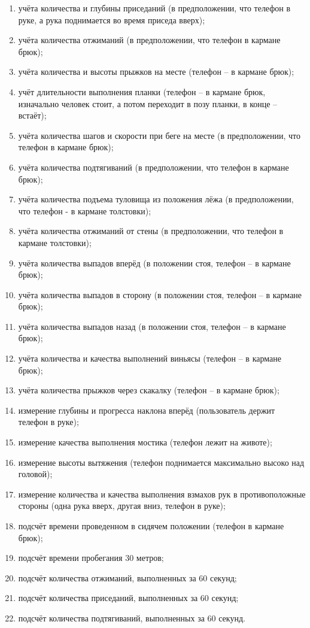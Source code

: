 \begin{enumerate}
	\item учёта количества и глубины приседаний (в предположении, что телефон в руке, а рука поднимается во время приседа вверх);
	\item учёта количества отжиманий (в предположении, что телефон в кармане брюк);
	\item учёта количества и высоты прыжков на месте (телефон -- в кармане брюк);
	\item учёт длительности выполнения планки (телефон -- в кармане брюк, изначально человек стоит, а потом переходит в позу планки, в конце -- встаёт);
	\item учёта количества шагов и скорости при беге на месте (в предположении, что телефон в кармане брюк);
	\item учёта количества подтягиваний (в предположении, что телефон в кармане брюк);
	\item учёта количества подъема туловища из положения лёжа (в предположении, что телефон - в кармане толстовки);
	\item учёта количества отжиманий от стены (в предположении, что телефон в кармане толстовки);
	\item учёта количества выпадов вперёд (в положении стоя, телефон -- в кармане брюк);
	\item учёта количества выпадов в сторону (в положении стоя, телефон -- в кармане брюк);
	\item учёта количества выпадов назад (в положении стоя, телефон -- в кармане брюк);
	\item учёта количества и качества выполнений виньясы (телефон -- в кармане брюк);
	\item учёта количества прыжков через скакалку (телефон -- в кармане брюк);
	\item измерение глубины и прогресса наклона вперёд (пользователь держит телефон в руке);
	\item измерение качества выполнения мостика (телефон лежит на животе);
	\item измерение высоты вытяжения (телефон поднимается максимально высоко над головой);
	\item измерение количества и качества выполнения взмахов рук в противоположные стороны (одна рука вверх, другая вниз, телефон в руке);
	\item подсчёт времени проведенном в сидячем положении (телефон в кармане брюк);
	\item подсчёт времени пробегания 30 метров;
	\item подсчёт количества отжиманий, выполненных за 60 секунд;
	\item подсчёт количества приседаний, выполненных за 60 секунд;
	\item подсчёт количества подтягиваний, выполненных за 60 секунд.
\end{enumerate}


